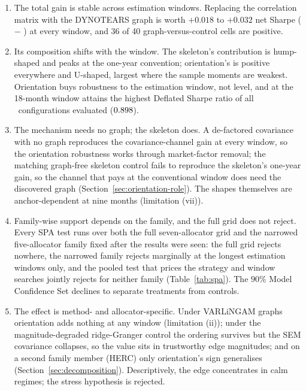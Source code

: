 \begin{enumerate}[itemsep=2pt]
  \item The total gain is stable across estimation windows.
        Replacing the correlation matrix with the DYNOTEARS graph is
        worth $+0.018$ to $+0.032$ net Sharpe (\skelsem{} $-$ \HRP{})
        at every window, and 36 of 40 graph-versus-control cells are
        positive.
  \item Its composition shifts with the window. The skeleton's
        contribution is hump-shaped and peaks at the one-year
        convention; orientation's is positive everywhere and U-shaped,
        largest where the sample moments are weakest. Orientation buys
        robustness to the estimation window, not level, and at the
        18-month window \orientsem{} attains the highest Deflated
        Sharpe ratio of all \rsNtrials\ configurations evaluated
        ($0.898$).
  \item The mechanism needs no graph; the skeleton does. A
        de-factored covariance with no graph reproduces the
        covariance-channel gain at every window, so the orientation
        robustness works through market-factor removal; the matching
        graph-free skeleton control fails to reproduce the skeleton's
        one-year gain, so the channel that pays at the conventional
        window does need the discovered graph
        (Section~\ref{sec:orientation-role}). The shapes themselves
        are anchor-dependent at nine months (limitation (vii)).
  \item Family-wise support depends on the family, and the
        full grid does not reject. Every SPA test runs over both the
        full seven-allocator grid and the narrowed five-allocator
        family fixed after the results were seen: the full grid rejects
        nowhere, the narrowed family rejects marginally at the longest
        estimation windows only, and the pooled test that prices the
        strategy and window searches jointly rejects for neither family
        (Table~\ref{tab:spa}). The $90\%$ Model Confidence Set declines
        to separate treatments from controls.
  \item The effect is method- and allocator-specific. Under
        VARLiNGAM graphs orientation adds nothing at any window
        (limitation (ii)); under the magnitude-degraded ridge-Granger
        control the ordering survives but the SEM covariance collapses,
        so the value sits in trustworthy edge magnitudes; and on a
        second family member (HERC) only orientation's sign generalises
        (Section~\ref{sec:decomposition}). Descriptively, the edge
        concentrates in calm regimes; the stress hypothesis is
        rejected.
\end{enumerate}

